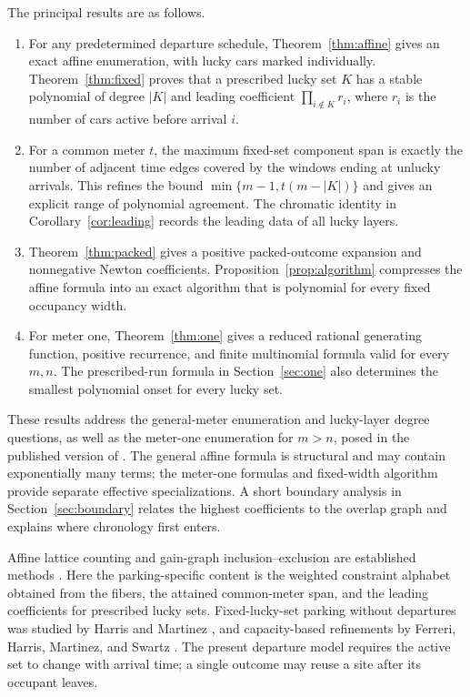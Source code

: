 \documentclass[11pt,a4paper]{article}
\begin{document}
The principal results are as follows.
\begin{enumerate}
\item For any predetermined departure schedule, Theorem~\ref{thm:affine} gives an exact affine enumeration, with lucky cars marked individually. Theorem~\ref{thm:fixed} proves that a prescribed lucky set $K$ has a stable polynomial of degree $|K|$ and leading coefficient $\prod_{i\notin K}r_i$, where $r_i$ is the number of cars active before arrival $i$.
\item For a common meter $t$, the maximum fixed-set component span is exactly the number of adjacent time edges covered by the windows ending at unlucky arrivals. This refines the bound $\min\{m-1,t(m-|K|)\}$ and gives an explicit range of polynomial agreement. The chromatic identity in Corollary~\ref{cor:leading} records the leading data of all lucky layers.
\item Theorem~\ref{thm:packed} gives a positive packed-outcome expansion and nonnegative Newton coefficients. Proposition~\ref{prop:algorithm} compresses the affine formula into an exact algorithm that is polynomial for every fixed occupancy width.
\item For meter one, Theorem~\ref{thm:one} gives a reduced rational generating function, positive recurrence, and finite multinomial formula valid for every $m,n$. The prescribed-run formula in Section~\ref{sec:one} also determines the smallest polynomial onset for every lucky set.
\end{enumerate}
These results address the general-meter enumeration and lucky-layer degree questions, as well as the meter-one enumeration for $m>n$, posed in the published version of \cite{DH}. The general affine formula is structural and may contain exponentially many terms; the meter-one formulas and fixed-width algorithm provide separate effective specializations. A short boundary analysis in Section~\ref{sec:boundary} relates the highest coefficients to the overlap graph and explains where chronology first enters.

Affine lattice counting and gain-graph inclusion--exclusion are established methods \cite{FZ,BC}. Here the parking-specific content is the weighted constraint alphabet obtained from the fibers, the attained common-meter span, and the leading coefficients for prescribed lucky sets. Fixed-lucky-set parking without departures was studied by Harris and Martinez \cite{HM}, and capacity-based refinements by Ferreri, Harris, Martinez, and Swartz \cite{FHMS}. The present departure model requires the active set to change with arrival time; a single outcome may reuse a site after its occupant leaves.
\end{document}
